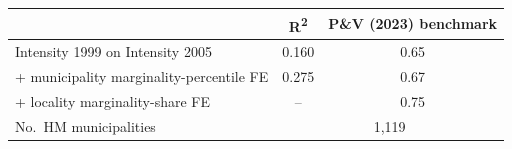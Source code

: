 \begin{tabular}{lcc} \hline \hline
& \multicolumn{1}{c}{R\textsuperscript{2}} & \multicolumn{1}{c}{P\&V (2023) benchmark} \\ \toprule
Intensity 1999 on Intensity 2005 & 0.160 & 0.65 \\ 
\quad + municipality marginality-percentile FE & 0.275 & 0.67 \\ 
\quad + locality marginality-share FE & -- & 0.75 \\ 
\bottomrule
No.\ HM municipalities & \multicolumn{2}{c}{1,119} \\ 
\end{tabular}